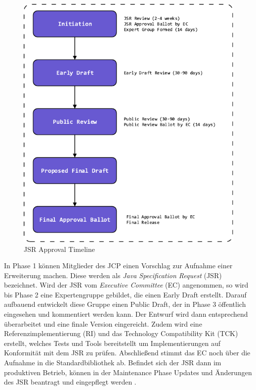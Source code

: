 \documentclass[11pt,a4paper,titlepage]{scrartcl}
\numberwithin{equation}{section}
\begin{document}
\begin{figure}[ht] 
	\begin{center}
		\includegraphics[scale=1]{img/jsr.pdf}
		\caption{JSR Approval Timeline}
		\label{fig:wsAPIJSRApproval}
	\end{center}
\end{figure}

\noindent In Phase 1 können Mitglieder des JCP einen Vorschlag zur Aufnahme einer Erweiterung machen. Diese werden als \textit{Java Specification Request} (JSR) bezeichnet. Wird der JSR vom \textit{Executive Committee} (EC) angenommen, so wird bis Phase 2 eine Expertengruppe gebildet, die einen Early Draft erstellt. Darauf aufbauend entwickelt diese Gruppe einen Public Draft, der in Phase 3 öffentlich eingesehen und kommentiert werden kann. Der Entwurf wird dann entsprechend überarbeitet und eine finale Version eingereicht. Zudem wird eine Referenzimplementierung (RI)  und das Technology Compatibility Kit (TCK) erstellt, welches Tests und Tools bereitstellt um Implementierungen auf Konformität mit dem JSR zu prüfen. Abschließend stimmt das EC noch über die Aufnahme in die Standardbibliothek ab. Befindet sich der JSR dann im produktiven Betrieb, können in der Maintenance Phase Updates und Änderungen des JSR beantragt und eingepflegt werden \autocite{oracle_corporation_java_2017}.\\
\end{document}
